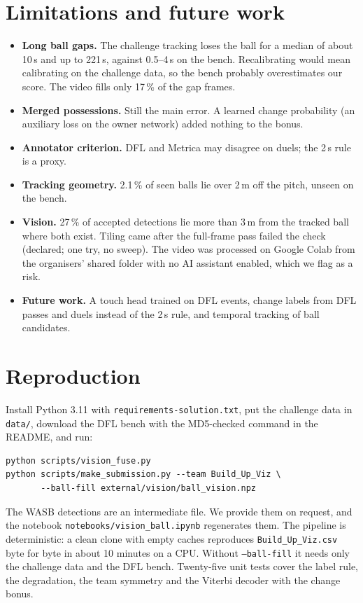 \documentclass[11pt,a4paper]{article}
\newcommand{\code}[1]{\texttt{#1}}
\begin{document}
\section{Limitations and future work}

\begin{itemize}
  \item \textbf{Long ball gaps.} The challenge tracking loses the ball for a median of about 10\,s and
    up to 221\,s, against 0.5--4\,s on the bench. Recalibrating would mean calibrating on the
    challenge data, so the bench probably overestimates our score. The video fills only 17\,\% of
    the gap frames.
  \item \textbf{Merged possessions.} Still the main error. A learned change probability (an
    auxiliary loss on the owner network) added nothing to the bonus.
  \item \textbf{Annotator criterion.} DFL and Metrica may disagree on duels; the 2\,s rule is a proxy.
  \item \textbf{Tracking geometry.} 2.1\,\% of seen balls lie over 2\,m off the pitch, unseen on the bench.
  \item \textbf{Vision.} 27\,\% of accepted detections lie more than 3\,m from the tracked ball where
    both exist. Tiling came after the full-frame pass failed the check (declared; one try, no sweep). The video was processed on Google Colab from
    the organisers' shared folder with no AI assistant enabled, which we flag as a risk.
  \item \textbf{Future work.} A touch head trained on DFL events, change labels from DFL passes and
    duels instead of the 2\,s rule, and temporal tracking of ball candidates.
\end{itemize}

\section{Reproduction}

Install Python 3.11 with \code{requirements-solution.txt}, put the challenge data in \code{data/},
download the DFL bench with the MD5-checked command in the README, and run:
\begin{verbatim}
python scripts/vision_fuse.py
python scripts/make_submission.py --team Build_Up_Viz \
       --ball-fill external/vision/ball_vision.npz
\end{verbatim}
The WASB detections are an intermediate file. We provide them on request, and the notebook
\code{notebooks/vision\_ball.ipynb} regenerates them. The pipeline is deterministic: a clean clone with empty caches
reproduces \code{Build\_Up\_Viz.csv} byte for byte in about 10 minutes on a CPU. Without
\code{--ball-fill} it needs only the challenge data and the DFL bench. Twenty-five unit tests cover
the label rule, the degradation, the team symmetry and the Viterbi decoder with the change bonus.
\end{document}
